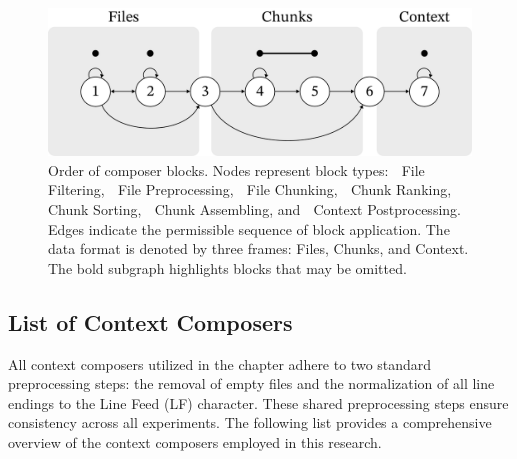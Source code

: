 \begin{figure}[ht]
    \centering
    \includegraphics[width=\textwidth]{figures/composer-blocks.pdf}
    \caption{Order of composer blocks. Nodes represent block types: \textcircled{} File Filtering, \textcircled{} File Preprocessing, \textcircled{} File Chunking, \textcircled{} Chunk Ranking, \textcircled{} Chunk Sorting, \textcircled{} Chunk Assembling, and \textcircled{} Context Postprocessing. Edges indicate the permissible sequence of block application. The data format is denoted by three frames: Files, Chunks, and Context. The bold subgraph highlights blocks that may be omitted.}\label{fig:composer-blocks}
\end{figure}

\subsection{List of Context Composers}\label{sec:context-composers-list}

All context composers utilized in the  chapter adhere to two standard preprocessing steps: the removal of empty files and the normalization of all line endings to the Line Feed (LF) character. These shared preprocessing steps ensure consistency across all experiments. The following list provides a comprehensive overview of the context composers employed in this research.


